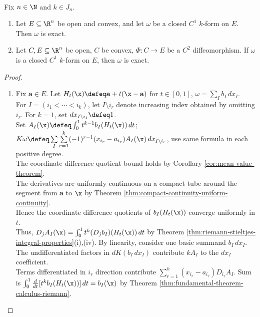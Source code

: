 \begin{theorem} \label{thm:poincare-lemma-convex-rudin} \\
Fix $n\in\N$ and $k\in J_n$.
\begin{enumerate}[label=(\roman*)]
\setlength{\itemsep}{0pt}
\item Let $E\subseteq\R^n$ be open and convex, and let $\omega$ be a closed $C^1$ $k$-form on $E$. Then $\omega$ is exact.
\item Let $C,E\subseteq\R^n$ be open, $C$ be convex, $\Phi:C\to E$ be a $C^2$ diffeomorphism. If $\omega$ is a closed $C^1$ $k$-form on $E$, then $\omega$ is exact.
\end{enumerate}
\begin{proof}
\begin{enumerate}[label=(\roman*)]
\setlength{\itemsep}{0pt}
\item Fix $\mathbf{a}\in E$. Let $H_t(\x)\defeq\mathbf{a}+t(\x-\mathbf{a})$ for $t\in[0,1]$, $\omega=\sum\limits_I b_I\,dx_I$.\\
For $I=(i_1<\cdots<i_k)$, let $I\setminus i_r$ denote increasing index obtained by omitting $i_r$. For $k=1$, set $dx_{I\setminus i_1}\defeq1$.\\
Set $A_I(\x)\defeq\int_0^1t^{k-1}b_I(H_t(\x))\,dt$;  $K\omega\defeq\sum\limits_I\sum\limits_{r=1}^{k}(-1)^{r-1}(x_{i_r}-a_{i_r})A_I(\x)\,dx_{I\setminus i_r}$, use same formula in each positive degree.\\
The coordinate difference-quotient bound holds by Corollary \ref{cor:mean-value-theorem}.\\
The derivatives are uniformly continuous on a compact tube around the segment from $\mathbf{a}$ to $\x$ by Theorem \ref{thm:compact-continuity-uniform-continuity}.\\
Hence the coordinate difference quotients of $b_I(H_t(\x))$ converge uniformly in $t$.\\
Thus, $D_jA_I(\x)=\int_0^1t^k(D_jb_I)(H_t(\x))\,dt$ by Theorem \ref{thm:riemann-stieltjes-integral-properties}(i),(iv). By linearity, consider one basic summand $b_I\,dx_I$.\\
The undifferentiated factors in $dK(b_I\,dx_I)$ contribute $kA_I$ to the $dx_I$ coefficient.\\
Terms differentiated in $i_r$ direction contribute $\sum\limits_{r=1}^{k}(x_{i_r}-a_{i_r})D_{i_r}A_I$. Sum is $\int_0^1\frac{d}{dt}[t^kb_I(H_t(\x))]\,dt=b_I(\x)$ by Theorem \ref{thm:fundamental-theorem-calculus-riemann}.\\

\end{enumerate}
\end{proof}
\end{theorem}
